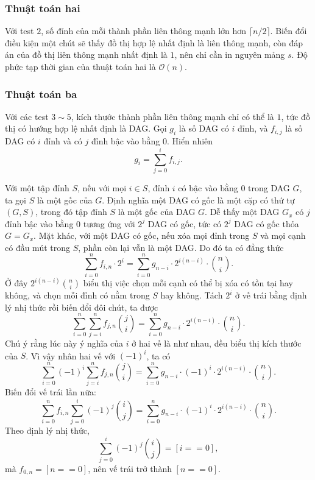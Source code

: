 \documentclass[11pt]{article}
\newcommand{\Oh}{\mathcal{O}}
\begin{document}
\subsubsection{Thuật toán hai}

Với test \(2\), số đỉnh của mỗi thành phần liên thông mạnh lớn hơn
\(\lceil n/2\rceil\). Biến đổi điều kiện một chút sẽ thấy đồ thị hợp lệ nhất
định là liên thông mạnh, còn đáp án của đồ thị liên thông mạnh nhất định là
\(1\), nên chỉ cần in nguyên mảng \(s\). Độ phức tạp thời gian của thuật toán
hai là \(\Oh(n)\).

\subsubsection{Thuật toán ba}

Với các test \(3\sim 5\), kích thước thành phần liên thông mạnh chỉ có thể là
\(1\), tức đồ thị có hướng hợp lệ nhất định là DAG. Gọi \(g_i\) là số DAG có
\(i\) đỉnh, và \(f_{i,j}\) là số DAG có \(i\) đỉnh và có \(j\) đỉnh bậc vào
bằng \(0\). Hiển nhiên
\[
  g_i=\sum_{j=0}^{i} f_{i,j}.
\]

Với một tập đỉnh \(S\), nếu với mọi \(i\in S\), đỉnh \(i\) có bậc vào bằng
\(0\) trong DAG \(G\), ta gọi \(S\) là một gốc của \(G\). Định nghĩa một DAG
có gốc là một cặp có thứ tự \((G,S)\), trong đó tập đỉnh \(S\) là một gốc của
DAG \(G\). Dễ thấy một DAG \(G_x\) có \(j\) đỉnh bậc vào bằng \(0\) tương ứng
với \(2^j\) DAG có gốc, tức có \(2^j\) DAG có gốc thỏa \(G=G_x\). Mặt khác,
với một DAG có gốc, nếu xóa mọi đỉnh trong \(S\) và mọi cạnh có đầu mút trong
\(S\), phần còn lại vẫn là một DAG. Do đó ta có đẳng thức
\[
  \sum_{i=0}^{n} f_{i,n}\cdot 2^i
  =
  \sum_{i=0}^{n} g_{n-i}\cdot 2^{i(n-i)}\cdot \binom{n}{i}.
\]
Ở đây \(2^{i(n-i)}\binom{n}{i}\) biểu thị việc chọn mỗi cạnh có thể bị xóa có
tồn tại hay không, và chọn mỗi đỉnh có nằm trong \(S\) hay không. Tách \(2^i\)
ở vế trái bằng định lý nhị thức rồi biến đổi đôi chút, ta được
\[
  \sum_{i=0}^{n}\sum_{j=i}^{n} f_{j,n}\binom{j}{i}
  =
  \sum_{i=0}^{n} g_{n-i}\cdot 2^{i(n-i)}\cdot \binom{n}{i}.
\]
Chú ý rằng lúc này ý nghĩa của \(i\) ở hai vế là như nhau, đều biểu thị kích
thước của \(S\). Vì vậy nhân hai vế với \((-1)^i\), ta có
\[
  \sum_{i=0}^{n}(-1)^i\sum_{j=i}^{n} f_{j,n}\binom{j}{i}
  =
  \sum_{i=0}^{n}g_{n-i}\cdot (-1)^i\cdot 2^{i(n-i)}\cdot \binom{n}{i}.
\]
Biến đổi vế trái lần nữa:
\[
  \sum_{i=0}^{n} f_{i,n}
    \sum_{j=0}^{i}(-1)^j\binom{i}{j}
  =
  \sum_{i=0}^{n}g_{n-i}\cdot (-1)^i\cdot 2^{i(n-i)}\cdot \binom{n}{i}.
\]
Theo định lý nhị thức,
\[
  \sum_{j=0}^{i}(-1)^j\binom{i}{j}=[i==0],
\]
mà \(f_{0,n}=[n==0]\), nên vế trái trở thành \([n==0]\).
\end{document}
